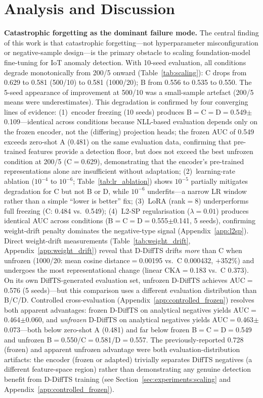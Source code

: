 \section{Analysis and Discussion}
\label{sec:analysis}

\textbf{Catastrophic forgetting as the dominant failure mode.}
The central finding of this work is that catastrophic forgetting---not
hyperparameter misconfiguration or negative-sample design---is the primary
obstacle to scaling foundation-model fine-tuning for IoT anomaly detection.
With 10-seed evaluation, all conditions degrade monotonically from 200/5
onward (Table~\ref{tab:scaling}): C drops from 0.629 to 0.581 (500/10) to
0.581 (1000/20); B from 0.556 to 0.535 to 0.550.
The 5-seed appearance of improvement at 500/10 was a small-sample artefact
(200/5 means were underestimates).
This degradation is confirmed by four converging lines of evidence:
(1)~encoder freezing (10 seeds) produces B$=$C$=$D$=$0.549$\pm$0.109---identical
across conditions because NLL-based evaluation depends only on the frozen
encoder, not the (differing) projection heads; the frozen AUC of 0.549
exceeds zero-shot A (0.481) on the same evaluation data, confirming that
pre-trained features provide a detection floor, but does not exceed the
best unfrozen condition at 200/5 (C$=$0.629), demonstrating that the
encoder's pre-trained representations alone are insufficient without
adaptation;
(2)~learning-rate ablation ($10^{-4}$ to $10^{-6}$; Table~\ref{tab:lr_ablation})
shows $10^{-5}$ partially mitigates degradation for C but not B or D, while
$10^{-6}$ underfits---a narrow LR window rather than a simple ``lower is better'' fix;
(3)~LoRA (rank$=$8) underperforms full freezing (C: 0.484 vs.\ 0.549);
(4)~L2-SP regularisation ($\lambda{=}0.01$) produces identical AUC across
conditions (B$=$C$=$D$=$0.555$\pm$0.141, 5 seeds), confirming weight-drift
penalty dominates the negative-type signal (Appendix~\ref{app:l2sp}).
Direct weight-drift measurements (Table~\ref{tab:weight_drift},
Appendix~\ref{app:weight_drift}) reveal that D-DiffTS drifts \emph{more}
than C when unfrozen (1000/20: mean cosine distance$=$0.00195 vs.\ C 0.000432,
$+$352\%) and undergoes the most representational change (linear
CKA$=$0.183 vs.\ C 0.373).
On its own DiffTS-generated evaluation set, unfrozen D-DiffTS achieves
AUC$=$0.576 (5 seeds)---but this comparison uses a different evaluation
distribution than B/C/D.
Controlled cross-evaluation (Appendix~\ref{app:controlled_frozen}) resolves
both apparent advantages: frozen D-DiffTS on analytical negatives yields
AUC$=$0.464$\pm$0.060, and \emph{unfrozen} D-DiffTS on analytical negatives
yields AUC$=$0.463$\pm$0.073---both below zero-shot A (0.481) and far below
frozen B$=$C$=$D$=$0.549 and unfrozen B$=$0.550/C$=$0.581/D$=$0.557.
The previously-reported 0.728 (frozen) and apparent unfrozen advantage were
both evaluation-distribution artifacts: the encoder (frozen or adapted)
trivially separates DiffTS negatives (a different feature-space region)
rather than demonstrating any genuine detection benefit from D-DiffTS training
(see Section~\ref{sec:experiments:scaling} and Appendix~\ref{app:controlled_frozen}).

